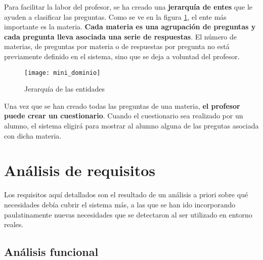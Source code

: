 Para facilitar la labor del profesor, se ha creado una \textbf{jerarquía de entes} que le ayuden a clasificar las preguntas. Como se ve en la figura \ref{fig:mini dominio}, el ente más importante es la materia. \textbf{Cada materia es una agrupación de preguntas y cada pregunta lleva asociada una serie de respuestas}. El número de materias, de preguntas por materia o de respuestas por pregunta no está previamente definido en el sistema, sino que se deja a voluntad del profesor.

\begin{figure}[htp!]
	\centering
	\texttt{[image: mini\_dominio]}
	\caption{Jerarquía de las entidades}
	\label{fig:mini dominio}
\end{figure}

Una vez que se han creado todas las preguntas de una materia, \textbf{el profesor puede crear un cuestionario}. Cuando el cuestionario sea realizado por un alumno, el sistema eligirá para mostrar al alumno alguna de las pregutas asociada con dicha materia.




\section{Análisis de requisitos}

Los requisitos aquí detallados son el resultado de un análisis a priori sobre qué necesidades debía cubrir el sistema más, a las que se han ido incorporando paulatinamente nuevas necesidades que se detectaron al ser utilizado en entorno reales. %

\subsection{Análisis funcional}

